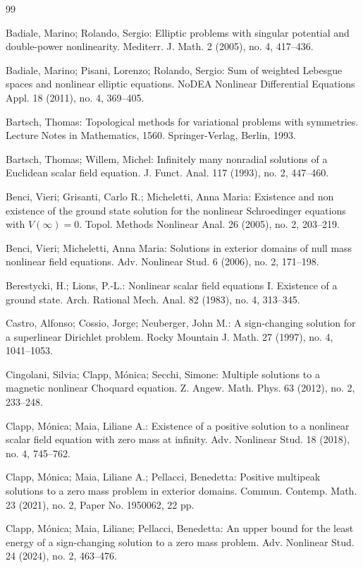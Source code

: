\documentclass[10pt,letterpaper]{article}
\numberwithin{equation}{section}
\begin{document}
\begin{thebibliography}{99}

Badiale, Marino; Rolando, Sergio: Elliptic problems with singular potential and double-power nonlinearity. Mediterr. J. Math. 2 (2005), no. 4, 417--436.

Badiale, Marino; Pisani, Lorenzo; Rolando, Sergio: Sum of weighted Lebesgue spaces and nonlinear elliptic equations. NoDEA Nonlinear Differential Equations Appl. 18 (2011), no. 4, 369–405. 

Bartsch, Thomas: Topological methods for variational problems with symmetries. Lecture Notes in Mathematics, 1560. Springer-Verlag, Berlin, 1993.

Bartsch, Thomas; Willem, Michel: Infinitely many nonradial solutions of a Euclidean scalar field equation. J. Funct. Anal. 117 (1993), no. 2, 447–460.

Benci, Vieri; Grisanti, Carlo R.; Micheletti, Anna Maria: Existence and non existence of the ground state solution for the nonlinear Schroedinger equations with $V(\infty)=0$. Topol. Methods Nonlinear Anal. 26
(2005), no. 2, 203--219.

Benci, Vieri; Micheletti, Anna Maria: Solutions in exterior domains of null mass nonlinear field equations. Adv. Nonlinear Stud. 6 (2006), no. 2, 171--198.

Berestycki, H.; Lions, P.-L.: Nonlinear scalar field equations I. Existence of a ground state. Arch. Rational Mech. Anal. 82 (1983), no. 4, 313--345.

Castro, Alfonso; Cossio, Jorge; Neuberger, John M.: A sign-changing solution for a superlinear Dirichlet problem. Rocky Mountain J. Math. 27 (1997), no. 4, 1041–1053.

Cingolani, Silvia; Clapp, Mónica; Secchi, Simone: Multiple solutions to a magnetic nonlinear Choquard equation. Z. Angew. Math. Phys. 63 (2012), no. 2, 233–248. 

Clapp, Mónica; Maia, Liliane A.: Existence of a positive solution to a nonlinear scalar field equation with zero mass at infinity. Adv. Nonlinear Stud. 18 (2018), no. 4, 745–762.

Clapp, Mónica; Maia, Liliane A.; Pellacci, Benedetta: Positive multipeak solutions to a zero mass problem in exterior domains. Commun. Contemp. Math. 23 (2021), no. 2, Paper No. 1950062, 22 pp.

Clapp, Mónica; Maia, Liliane; Pellacci, Benedetta: An upper bound for the least energy of a sign-changing solution to a zero mass problem. Adv. Nonlinear Stud. 24 (2024), no. 2, 463–476.


\end{thebibliography}
\end{document}
